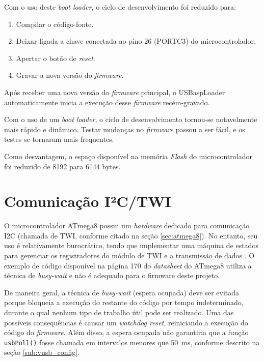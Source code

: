 \documentclass[brazil,pagestart=firstchapter]{abnt}
\begin{document}
Com o uso deste \textit{boot loader}, o ciclo de desenvolvimento foi
reduzido para:

\begin{enumerate}
\item Compilar o código-fonte.
\item Deixar ligada a chave conectada ao pino 26 (PORTC3) do
microcontrolador.
\item Apertar o botão de \textit{reset}.
\item Gravar a nova versão do \textit{firmware}.
\end{enumerate}

Após receber uma nova versão do \textit{firmware} principal, o USBaspLoader
automaticamente inicia a execução desse \textit{firmware} recém-gravado.

Com o uso de um \textit{boot loader}, o ciclo de desenvolvimento tornou-se
notavelmente mais rápido e dinâmico. Testar mudanças no \textit{firmware}
passou a ser fácil, e os testes se tornaram mais frequentes.

Como desvantagem, o espaço disponível na memória \textit{Flash} do
microcontrolador foi reduzido de \num{8192} para \num{6144} bytes.


\section{Comunicação I²C/TWI}
\label{sec:twi}

O microcontrolador ATmega8 possui um \textit{hardware} dedicado para
comunicação \ac{I2C} (chamada de \ac{TWI}, conforme citado na seção
\ref{sec:atmega8}). No entanto, seu uso é relativamente burocrático, tendo
que implementar uma máquina de estados para gerenciar os registradores do
módulo de \ac{TWI} e a transmissão de dados \cite{ATmega8}. O
exemplo de código disponível na página 170 do \textit{datasheet} do ATmega8
utiliza a técnica de \textit{busy-wait} e não é adequado para o firmware
deste projeto.

De maneira geral, a técnica de \textit{busy-wait} (espera ocupada) deve
ser evitada porque bloqueia a execução do restante do código por tempo
indeterminado, durante o qual nenhum tipo de trabalho útil pode ser
realizado. Uma das possíveis consequências é causar um \textit{watchdog
reset}, reiniciando a execução do código do \textit{firmware}. Além disso,
a espera ocupada não garantiria que a função \texttt{usbPoll()} fosse
chamada em intervalos menores que \SI{50}{\milli\second}, conforme descrito
na seção \ref{sub:vusb_config}.
\end{document}
